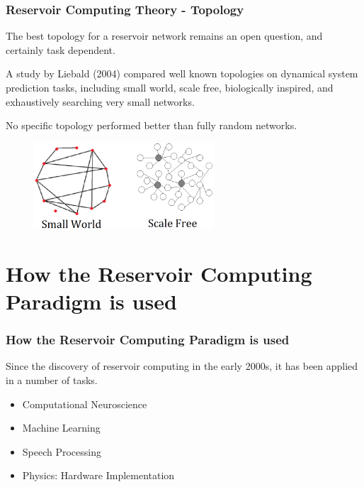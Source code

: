 \documentclass{beamer}
\begin{document}

\begin{frame}
\frametitle{Reservoir Computing Theory - Topology}
The best topology for a reservoir network remains an open question, and certainly task dependent.
\vspace{0.8mm}

A study by Liebald (2004) compared well known topologies on dynamical system prediction tasks, including small world, scale free, biologically inspired, and exhaustively searching very small networks.
\vspace{0.8mm}

No specific topology performed better than fully random networks.
\begin{figure}[!htbp]
\centering
\includegraphics[width=0.6\textwidth]{pictures/top-ex.png}
\label{fig:top-ex}
\end{figure}

\end{frame}


\section{How the Reservoir Computing Paradigm is used}

\begin{frame}
\frametitle{How the Reservoir Computing Paradigm is used}

Since the discovery of reservoir computing in the early 2000s, it has been applied in a number of tasks.
\begin{itemize}
\item Computational Neuroscience
\item Machine Learning
\item Speech Processing
\item Physics: Hardware Implementation
\end{itemize}

\end{frame}
\end{document}

